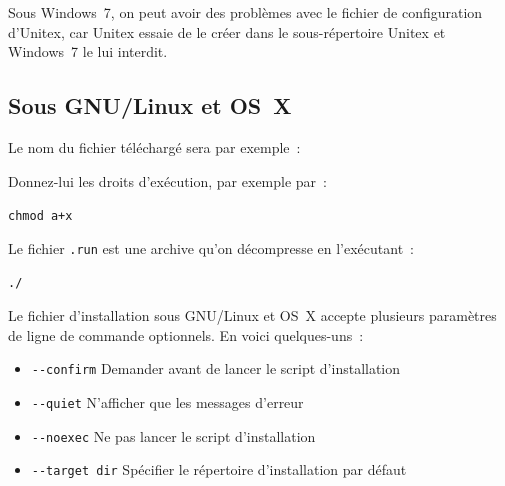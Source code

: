 \noindent Sous Windows~7, on peut avoir des problèmes avec le fichier de configuration d'Unitex, car Unitex
essaie de le créer dans le sous-répertoire Unitex et Windows~7 le lui interdit.

\subsection{Sous GNU/Linux et OS~X}
Le nom du fichier téléchargé sera par exemple~:

\begin{flushleft}
{\tt \UnitexPackageLinux{}}
{\tt \UnitexPackageLinuxSF{}}
\end{flushleft}

\noindent Donnez-lui les droits d'exécution, par exemple par~:

\begin{flushleft}
{\tt chmod a+x \UnitexPackageLinux{}}
\end{flushleft}

\noindent Le fichier \verb+.run+ est une archive qu'on décompresse en l'exécutant~: 

\begin{flushleft}
{\tt ./\UnitexPackageLinux{}}
\end{flushleft}

\begin{samepage}
\noindent Le fichier d'installation sous GNU/Linux et OS~X accepte plusieurs paramètres de ligne de commande optionnels. En voici quelques-uns~:

\begin{itemize}
\itemsep1pt\parskip0pt
\item
  \texttt{-\/-confirm} \hspace{.15in} Demander avant de lancer le script d'installation \\
\item
  \texttt{-\/-quiet} \hspace{.15in} N'afficher que les messages d'erreur\\
\item
  \texttt{-\/-noexec} \hspace{.15in} Ne pas lancer le script d'installation \\
\item
  \texttt{-\/-target dir}  \hspace{.15in} Spécifier le répertoire d'installation par défaut
\end{itemize}
\end{samepage}

